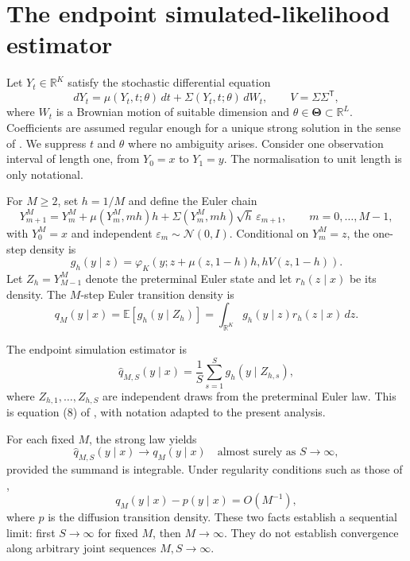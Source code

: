 \documentclass[11pt]{article}
\theoremstyle{definition}
\newcommand{\R}{\mathbb{R}}
\newcommand{\E}{\mathbb{E}}
\newcommand{\Normal}{\mathcal{N}}
\newcommand{\ThetaSet}{\boldsymbol{\Theta}}
\newcommand{\phik}{\varphi_K}
\begin{document}
\section{The endpoint simulated-likelihood estimator}\label{sec:estimator}

Let $Y_t\in\R^K$ satisfy the stochastic differential equation
\begin{equation}\label{eq:sde}
 dY_t=\mu(Y_t,t;\theta)\,dt+\Sigma(Y_t,t;\theta)\,dW_t,
 \qquad V=\Sigma\Sigma^{\mathsf T},
\end{equation}
where $W_t$ is a Brownian motion of suitable dimension and $\theta\in\ThetaSet\subset\R^L$. Coefficients are assumed regular enough for a unique strong solution in the sense of \citet{KaratzasShreve1991}. We suppress $t$ and $\theta$ where no ambiguity arises. Consider one observation interval of length one, from $Y_0=x$ to $Y_1=y$. The normalisation to unit length is only notational.

For $M\ge2$, set $h=1/M$ and define the Euler chain \citep{KloedenPlaten1992}
\begin{equation}\label{eq:euler}
Y^M_{m+1}=Y^M_m+\mu(Y^M_m,mh)h
 +\Sigma(Y^M_m,mh)\sqrt{h}\,\varepsilon_{m+1},
\qquad m=0,\ldots,M-1,
\end{equation}
with $Y^M_0=x$ and independent $\varepsilon_m\sim\Normal(0,I)$. Conditional on $Y^M_m=z$, the one-step density is
\begin{equation}\label{eq:one_step_kernel}
g_h(y\mid z)
=
\phik\!\left(y;
 z+\mu(z,1-h)h,
 hV(z,1-h)
\right).
\end{equation}
Let $Z_h=Y^M_{M-1}$ denote the preterminal Euler state and let $r_h(z\mid x)$ be its density. The $M$-step Euler transition density is
\begin{equation}\label{eq:euler_density_expectation}
q_M(y\mid x)=\E[g_h(y\mid Z_h)]
=\int_{\R^K}g_h(y\mid z)r_h(z\mid x)\,dz.
\end{equation}

The endpoint simulation estimator is
\begin{equation}\label{eq:pedersen_estimator}
\widehat q_{M,S}(y\mid x)
=
\frac{1}{S}\sum_{s=1}^S g_h(y\mid Z_{h,s}),
\end{equation}
where $Z_{h,1},\ldots,Z_{h,S}$ are independent draws from the preterminal Euler law. This is equation (8) of \citet{BrandtSantaClara2002}, with notation adapted to the present analysis.

For each fixed $M$, the strong law yields
\[
\widehat q_{M,S}(y\mid x)\longrightarrow q_M(y\mid x)
\quad\text{almost surely as }S\to\infty,
\]
provided the summand is integrable. Under regularity conditions such as those of \citet{BallyTalay1995,BallyTalay1996},
\[
q_M(y\mid x)-p(y\mid x)=O(M^{-1}),
\]
where $p$ is the diffusion transition density. These two facts establish a sequential limit: first $S\to\infty$ for fixed $M$, then $M\to\infty$. They do not establish convergence along arbitrary joint sequences $M,S\to\infty$.
\end{document}
